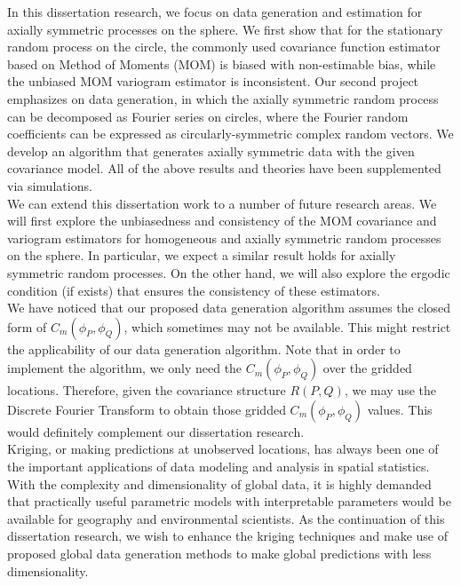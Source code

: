 %
%

In this dissertation research, we focus on data generation and estimation for axially symmetric processes on the sphere. We first show that for the stationary random process on the circle, the commonly used covariance function estimator based on Method of Moments (MOM) is biased with non-estimable bias, while the unbiased MOM variogram estimator is inconsistent. Our second project emphasizes on data generation, in which the axially symmetric random process can be decomposed as Fourier series on circles, where the Fourier random coefficients can be expressed as circularly-symmetric complex random vectors. We develop an algorithm that generates axially symmetric data with the given covariance model. All of the above results and theories have been supplemented via simulations. \\ 

We can extend this dissertation work to a number of future research areas. We will first explore the unbiasedness and consistency of the MOM covariance and variogram estimators for homogeneous and axially symmetric random processes on the sphere. In particular, we expect a similar result holds for axially symmetric random processes. On the other hand, we will also explore the ergodic condition (if exists) that ensures the consistency of these estimators. \\

We have noticed that our proposed data generation algorithm assumes the closed form of $C_m(\phi_P, \phi_Q)$, which sometimes may not be available. This might restrict the applicability of our data generation algorithm. Note that in order to implement the algorithm, we only need the $C_m(\phi_P, \phi_Q)$ over the gridded locations. Therefore, given the covariance structure $R(P, Q)$, we may use the Discrete Fourier Transform to obtain those gridded $C_m(\phi_P, \phi_Q)$ values. This would definitely complement our dissertation research. \\

Kriging, or making predictions at unobserved locations, has always been one of the important applications of data modeling and analysis in spatial statistics. With the complexity and dimensionality of global data, it is highly demanded that practically useful parametric models with interpretable parameters would be available for geography and environmental scientists. As the continuation of this dissertation research, we wish to enhance the kriging techniques and make use of proposed global data generation methods to make global predictions with less dimensionality.

%